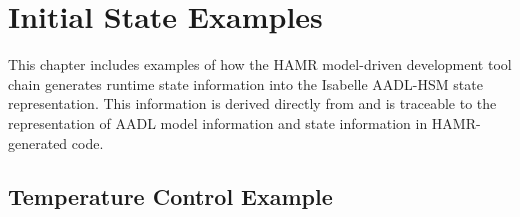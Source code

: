 \documentclass[10pt,oneside]{book}
\begin{document}
\chapter{Initial State Examples}

This chapter includes examples of how the HAMR model-driven
development tool chain generates runtime state information into the
Isabelle AADL-HSM state representation.  This information is derived
directly from and is traceable to the representation of AADL model
information and state information in HAMR-generated code.

\section{Temperature Control Example}





\end{document}
